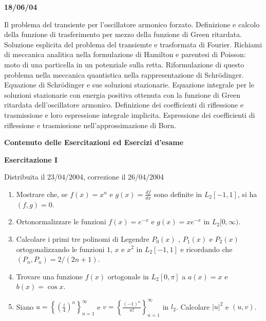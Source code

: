 \documentclass[a4paper,10pt]{article}
\begin{document}
\vskip 12pt
\noindent
\textbf{18/06/04}

\noindent
Il problema del transiente per l'oscillatore armonico forzato. Definizione e calcolo della funzione di trasferimento per mezzo della funzione di Green ritardata. Soluzione esplicita  del problema del transiemte e trasformata di Fourier. Richiami di meccanica analitica nella formulazione di Hamilton e parentesi di Poisson: moto di una particella in un potenziale sulla retta. Riformulazione di questo problema nella meccanica quantistica nella rappresentazione di Schr\"{o}dinger. Equazione di Schr\"{o}dinger e sue soluzioni stazionarie. Equazione integrale per le soluzioni stazionarie con energia positiva ottenuta con la funzione di Green ritardata dell'oscillatore armonico. Definizione dei coefficienti di riflessione e trasmissione e loro espressione integrale implicita. Espressione dei coefficienti di riflessione e trasmissione nell'approssimazione di Born.  
  


\newpage
\centerline{\LARGE \bf Contenuto delle Esercitazioni ed Esercizi d'esame}
\vskip 12pt
\noindent


\centerline{\LARGE \bf Esercitazione I}
\centerline{Distribuita il 23/04/2004, correzione il 26/04/2004}

\begin{enumerate}
\item Mostrare che, se $f(x)=x^n$ e $g(x)=\frac{df}{dx}$ sono
definite in $L_2[-1,1]$, si ha $(f,g)=0$.
\item Ortonormalizzare le funzioni $f(x)=e^{-x}$ e $g(x)=x e^{-x}$
in $L_2[0,\infty)$.
\item Calcolare i primi tre polinomi di Legendre $P_0(x)$ , $P_1(x)$ e $P_2(x)$ ortogonalizzando
le funzioni $1$, $x$ e $x^2$ in $L_2[-1,1]$ e ricordando che $(P_n,P_n)=2/(2n+1)$.
\item Trovare una funzione $f(x)$ ortogonale in $L_2[0,\pi]$
a $a(x)=x$ e $b(x)=\cos x$.
\item Siano 
$u= \left\{ \left( \frac{i}{4} \right)^n \right\}_{n=1}^{\infty}$
e
$v= \left\{ \frac{(-1)^n}{n!} \right\}_{n=1}^{\infty}$ in $l_2$.
Calcolare $|u|^2$ e $(u,v)$.
\end{enumerate}

\vskip10pt
\end{document}
